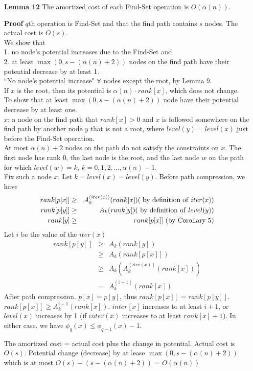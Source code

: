 \documentclass{beamer}
\begin{document}
\begin{frame}{}

{\bf Lemma 12} The amortized cost of each {\sc Find-Set} operation is $O(\alpha(n))$. 

{\bf Proof} $q$th operation is {\sc Find-Set} and that the find path contains $s$ nodes. The
actual cost is $O(s)$. \\
We show that \\
1. no node's potential increases due to the Find-Set and \\
2. at least $\max(0,s-(\alpha(n)+2))$ nodes on the find path have their potential decrease by at
 least 1. \\
``No node's potential increase" $\forall$ nodes except the root, by Lemma 9. \\
If $x$ is the root, then its potential is $\alpha(n)\cdot rank[x]$, which does not change. \\

To show that at least $\max(0,s-(\alpha(n)+2))$ node have their potential decrease by at least one. \\
$x$: a node on the find path that $rank[x]>0$ and $x$ is followed somewhere on the find path by another
 node $y$ that is not a root, where $level(y)=level(x)$ just before the {\sc Find-Set} operation.  \\
At most $\alpha(n)+2$ nodes on the path do not satisfy the constraints on $x$. The first node has
 rank 0, the last node is the root, and the last node $w$ on the path for which $level(w)=k$, $k=0, 1,
 2, \ldots, \alpha(n)-1$. \\

Fix such a node $x$. Let $k=level(x)=level(y)$. Before path compression, we have
\begin{eqnarray*}
rank[p[x]] &\ge& A_k^{(iter(x))}(rank[x]) ({\rm \ by\ definition\ of\ }iter(x)) \\
rank[p[y]] &\ge& A_k(rank[y]) ({\rm\ by\ definition \ of\ }level(y)) \\
rank[y] &\ge& rank[p[x]] {\rm\ (by\ Corollary\ 5)}
\end{eqnarray*} 
Let $i$ be the value of the $iter(x)$ 
\begin{eqnarray*}
rank[p[y]] &\ge& A_k(rank[y]) \\
 &\ge& A_k(rank[p[x]]) \\
 &\ge& A_k(A_k^{(iter(x))}(rank[x])) \\
 &=& A_k^{(i+1)}(rank[x])
\end{eqnarray*}
After path compression, $p[x]=p[y]$, thus $rank[p[x]]=rank[p[y]]$. $rank[p[x]]\ge A_k^{i+1}(rank[x])$.
$inter[x]$ increases to at least $i+1$, or $level(x)$ increases by 1 (if $inter(x)$ increases to at least
 $rank[x]+1$). In either case, we have $\phi_q(x)\le \phi_{q-1}(x)-1$. 

The amortized cost = actual cost plus the change in potential. Actual cost is $O(s)$.
Potential change (decrease) by at lease $\max(0,s-(\alpha(n)+2))$ which is at most
$O(s)-(s-(\alpha(n)+2))$ = $O(\alpha(n))$
\end{frame}
\end{document}
